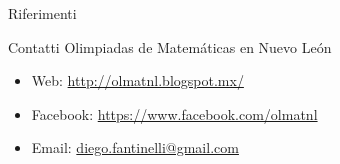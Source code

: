 \documentclass[final]{beamer}
\newlength{\onecolwid}
\begin{document}
\begin{frame}[t]
\begin{columns}[t]
\begin{column}{\onecolwid}
\begin{block}{Riferimenti}

\nocite{*} %
\small{
\vspace{0.75in}}

\end{block}


\begin{alertblock}{Contatti}
Olimpiadas de Matemáticas en Nuevo León
\begin{itemize}
\item Web:
\href{http://olmatnl.blogspot.mx/}{http://olmatnl.blogspot.mx/}
\item Facebook: \href{https://www.facebook.com/olmatnl}{https://www.facebook.com/olmatnl}
\item Email: \href{mailto:}{diego.fantinelli@gmail.com}
\end{itemize}
\end{alertblock}


\end{column} %

\end{columns} %

\end{frame} %
\end{document}
